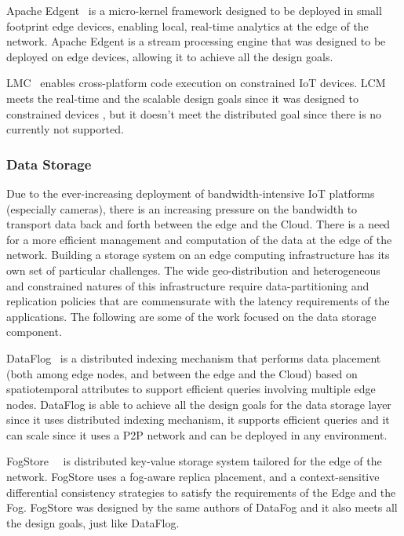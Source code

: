 Apache Edgent~\cite{edgent} is a micro-kernel framework designed to be deployed in small footprint edge devices, enabling local, real-time analytics at the edge of the network. Apache Edgent is a stream processing engine that was designed to be deployed on edge devices, allowing it to achieve all the design goals.

LMC~\cite{8102173} enables cross-platform code execution on constrained IoT devices. LCM meets the real-time and the scalable design goals since it was designed to constrained devices , but it doesn't meet the distributed goal since there is no currently not supported.

\subsubsection{Data Storage}

Due to the ever-increasing deployment of bandwidth-intensive IoT platforms (especially cameras), there is an increasing pressure on the bandwidth to transport data back and forth between the edge and the Cloud. There is a need for a more efficient management and computation of the data at the edge of the network. Building a storage system on an edge computing infrastructure has its own set of particular challenges. The wide geo-distribution and heterogeneous and constrained natures of this infrastructure require data-partitioning and replication policies that are commensurate with the latency requirements of the applications. The following are some of the work focused on the data storage component.

DataFlog~\cite{DataFog:2018} is a distributed indexing mechanism that performs data placement (both among edge nodes, and between the edge and the Cloud) based on spatiotemporal attributes to support efficient queries involving multiple edge nodes. DataFlog is able to achieve all the design goals for the data storage layer since it uses distributed indexing mechanism, it supports efficient queries and it can scale since it uses a P2P network and can be deployed in any environment.

FogStore~\cite{Gupta:2018}~\cite{Mayer2017FogStore} is distributed key-value storage system tailored for the edge of the network. FogStore uses a fog-aware replica placement, and a context-sensitive differential consistency strategies to satisfy the requirements of the Edge and the Fog. FogStore was designed by the same authors of DataFog and it also meets all the design goals, just like DataFlog.

